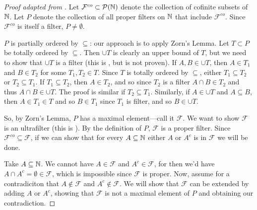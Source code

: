 \begin{proof}[Proof adapted from ]
    Let $\mathcal{F}^{co} \subset \mathcal{P}(\mathbb{N})$ denote the collection of cofinite subsets of $\mathbb{N}$. Let $P$ denote the collection of all proper filters on $\mathbb{N}$ that include $\mathcal{F}^{co}$. Since $\mathcal{F}^{co}$ is itself a filter, $P \neq \emptyset$. 

    $P$ is partially ordered by $\subseteq$: our approach is to apply Zorn's Lemma. Let $T \subset P$ be totally ordered by $\subseteq$. Then $\cup T$ is clearly an upper bound of $T$, but we need to show that $\cup T$ is a filter (this is \cite[Example~2.4(4)]{goldblatt1998}, but is not proven). If $A, B \in \cup T$, then $A \in T_1$ and $B \in T_2$ for some $T_1, T_2 \in T$. Since $T$ is totally ordered by $\subseteq$, either $T_1 \subseteq T_2$ or $T_2 \subseteq T_1$. If $T_1 \subseteq T_2$, then $A \in T_2$, and so since $T_2$ is a filter $A \cap B \in T_2$ and thus $A \cap B \in \cup T$. The proof is similar if $T_2 \subseteq T_1$. Similarly, if $A \in \cup T$ and $A \subseteq B$, then $A \in T_1 \in T$ and so $B \in T_1$ since $T_1$ is  filter, and so $B \in \cup T$.

    So, by Zorn's Lemma, $P$ has a maximal element---call it $\mathcal{F}$. We want to show $\mathcal{F}$ is an ultrafilter (this is \cite[Exercise~2.5(6)]{goldblatt1998}). By the definition of $P$, $\mathcal{F}$ is a proper filter. Since $\mathcal{F}^{co} \subseteq \mathcal{F}$, if we can show that for every $A \subseteq \mathbb{N}$ either $A$ or $A^c$ is in $\mathcal{F}$ we will be done.

    Take $A \subseteq \mathbb{N}$. We cannot have $A \in \mathcal{F}$ and $A^c \in \mathcal{F}$, for then we'd have $A \cap A^c = \emptyset \in \mathcal{F}$, which is impossible since $\mathcal{F}$ is proper. Now, assume for a contradiciton that $A \notin \mathcal{F}$ and $A^c \notin \mathcal{F}$. We will show that $\mathcal{F}$ can be extended by adding $A$ or $A^c$, showing that $\mathcal{F}$ is not a maximal element of $P$ and obtaining our contradiction. 


\end{proof}
